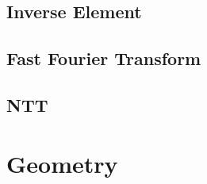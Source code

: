 \documentclass[a4paper,10pt,twocolumn,oneside]{article}
\begin{document}
\subsection{Inverse Element}


\subsection{Fast Fourier Transform}


%

%

\subsection{NTT}


%

%


\section{Geometry}
%

%
%
\end{document}

